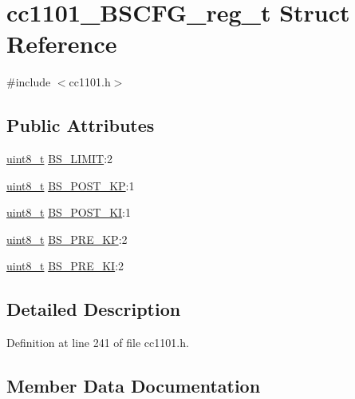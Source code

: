 \hypertarget{structcc1101___b_s_c_f_g__reg__t}{}\section{cc1101\+\_\+\+B\+S\+C\+F\+G\+\_\+reg\+\_\+t Struct Reference}
\label{structcc1101___b_s_c_f_g__reg__t}


{\ttfamily \#include $<$cc1101.\+h$>$}

\subsection*{Public Attributes}
\begin{DoxyCompactItemize}
\item 
\hyperlink{_p_e___types_8h_aba7bc1797add20fe3efdf37ced1182c5}{uint8\+\_\+t} \hyperlink{structcc1101___b_s_c_f_g__reg__t_a6dcdedcdc8332b3537d32002c93815c0}{B\+S\+\_\+\+L\+I\+M\+IT}\+:2
\item 
\hyperlink{_p_e___types_8h_aba7bc1797add20fe3efdf37ced1182c5}{uint8\+\_\+t} \hyperlink{structcc1101___b_s_c_f_g__reg__t_a60f391317ffec99c4e12177e75af8d29}{B\+S\+\_\+\+P\+O\+S\+T\+\_\+\+KP}\+:1
\item 
\hyperlink{_p_e___types_8h_aba7bc1797add20fe3efdf37ced1182c5}{uint8\+\_\+t} \hyperlink{structcc1101___b_s_c_f_g__reg__t_ae453cdd86877221f8bfc6facc280c937}{B\+S\+\_\+\+P\+O\+S\+T\+\_\+\+KI}\+:1
\item 
\hyperlink{_p_e___types_8h_aba7bc1797add20fe3efdf37ced1182c5}{uint8\+\_\+t} \hyperlink{structcc1101___b_s_c_f_g__reg__t_af6b1ff27b8200c3c154cd5c5792e79f7}{B\+S\+\_\+\+P\+R\+E\+\_\+\+KP}\+:2
\item 
\hyperlink{_p_e___types_8h_aba7bc1797add20fe3efdf37ced1182c5}{uint8\+\_\+t} \hyperlink{structcc1101___b_s_c_f_g__reg__t_ad14f3cb2da3ce9e319f681d5059e8b76}{B\+S\+\_\+\+P\+R\+E\+\_\+\+KI}\+:2
\end{DoxyCompactItemize}


\subsection{Detailed Description}


Definition at line 241 of file cc1101.\+h.



\subsection{Member Data Documentation}
